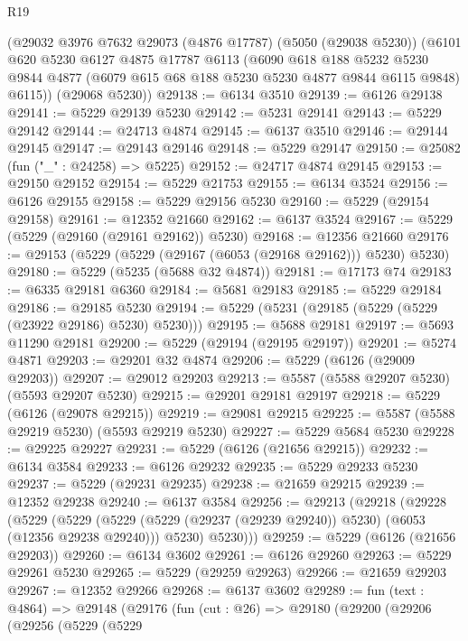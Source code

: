 \begin{lexlean}{R19}
\begin{coremodule}
    (@29032
      @3976
      @7632
      @29073
      (@4876 @17787)
      (@5050 (@29038 @5230))
      (@6101
        @620
        @5230
        @6127
        @4875
        @17787
        @6113
        (@6090
          @618
          @188
          @5232
          @5230
          @9844
          @4877
          (@6079 @615 @68 @188 @5230 @5230 @4877 @9844 @6115 @9848)
          @6115))
      (@29068 @5230))
@29138 := @6134 @3510
@29139 := @6126 @29138
@29141 := @5229 @29139 @5230
@29142 := @5231 @29141
@29143 := @5229 @29142
@29144 := @24713 @4874
@29145 := @6137 @3510
@29146 := @29144 @29145
@29147 := @29143 @29146
@29148 := @5229 @29147
@29150 := @25082 (fun ("_" : @24258) => @5225)
@29152 := @24717 @4874 @29145
@29153 := @29150 @29152
@29154 := @5229 @21753
@29155 := @6134 @3524
@29156 := @6126 @29155
@29158 := @5229 @29156 @5230
@29160 := @5229 (@29154 @29158)
@29161 := @12352 @21660
@29162 := @6137 @3524
@29167 := @5229 (@5229 (@29160 (@29161 @29162)) @5230)
@29168 := @12356 @21660
@29176 := @29153 (@5229 (@5229 (@29167 (@6053 (@29168 @29162))) @5230) @5230)
@29180 := @5229 (@5235 (@5688 @32 @4874))
@29181 := @17173 @74
@29183 := @6335 @29181 @6360
@29184 := @5681 @29183
@29185 := @5229 @29184
@29186 := @29185 @5230
@29194 := @5229 (@5231 (@29185 (@5229 (@5229 (@23922 @29186) @5230) @5230)))
@29195 := @5688 @29181
@29197 := @5693 @11290 @29181
@29200 := @5229 (@29194 (@29195 @29197))
@29201 := @5274 @4871
@29203 := @29201 @32 @4874
@29206 := @5229 (@6126 (@29009 @29203))
@29207 := @29012 @29203
@29213 := @5587 (@5588 @29207 @5230) (@5593 @29207 @5230)
@29215 := @29201 @29181 @29197
@29218 := @5229 (@6126 (@29078 @29215))
@29219 := @29081 @29215
@29225 := @5587 (@5588 @29219 @5230) (@5593 @29219 @5230)
@29227 := @5229 @5684 @5230
@29228 := @29225 @29227
@29231 := @5229 (@6126 (@21656 @29215))
@29232 := @6134 @3584
@29233 := @6126 @29232
@29235 := @5229 @29233 @5230
@29237 := @5229 (@29231 @29235)
@29238 := @21659 @29215
@29239 := @12352 @29238
@29240 := @6137 @3584
@29256 := @29213
    (@29218
      (@29228
        (@5229
          (@5229
            (@5229 (@5229 (@29237 (@29239 @29240)) @5230) (@6053 (@12356 @29238 @29240)))
            @5230)
          @5230)))
@29259 := @5229 (@6126 (@21656 @29203))
@29260 := @6134 @3602
@29261 := @6126 @29260
@29263 := @5229 @29261 @5230
@29265 := @5229 (@29259 @29263)
@29266 := @21659 @29203
@29267 := @12352 @29266
@29268 := @6137 @3602
@29289 := fun (text : @4864) =>
  @29148
    (@29176
      (fun (cut : @26) =>
      @29180
        (@29200
          (@29206
            (@29256
              (@5229
                (@5229

\end{coremodule}
\end{lexlean}
